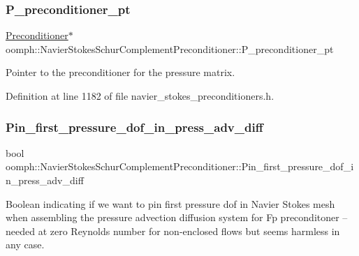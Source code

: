 \subsubsection{\texorpdfstring{P\+\_\+preconditioner\+\_\+pt}{P\_preconditioner\_pt}}
{\footnotesize\ttfamily \hyperlink{classoomph_1_1Preconditioner}{Preconditioner}$\ast$ oomph\+::\+Navier\+Stokes\+Schur\+Complement\+Preconditioner\+::\+P\+\_\+preconditioner\+\_\+pt\hspace{0.3cm}{\ttfamily [private]}}



Pointer to the \textquotesingle{}preconditioner\textquotesingle{} for the pressure matrix. 



Definition at line 1182 of file navier\+\_\+stokes\+\_\+preconditioners.\+h.

\mbox{\label{classoomph_1_1NavierStokesSchurComplementPreconditioner_a40ffaa90de4f861037cbd364789eb889}} 
\subsubsection{\texorpdfstring{Pin\+\_\+first\+\_\+pressure\+\_\+dof\+\_\+in\+\_\+press\+\_\+adv\+\_\+diff}{Pin\_first\_pressure\_dof\_in\_press\_adv\_diff}}
{\footnotesize\ttfamily bool oomph\+::\+Navier\+Stokes\+Schur\+Complement\+Preconditioner\+::\+Pin\+\_\+first\+\_\+pressure\+\_\+dof\+\_\+in\+\_\+press\+\_\+adv\+\_\+diff\hspace{0.3cm}{\ttfamily [private]}}



Boolean indicating if we want to pin first pressure dof in Navier Stokes mesh when assembling the pressure advection diffusion system for Fp preconditoner -- needed at zero Reynolds number for non-\/enclosed flows but seems harmless in any case. 



